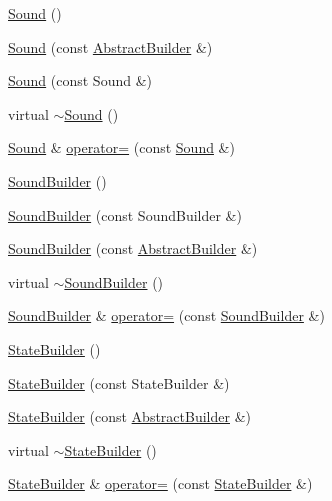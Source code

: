 \begin{DoxyCompactItemize}
\item 
\hyperlink{namespacejli_adde185173fc24f7fd6b0d882a8fa471a}{Sound} ()
\item 
\hyperlink{namespacejli_a0607478917c0dad447f434e0618be1d2}{Sound} (const \hyperlink{classjli_1_1_abstract_builder}{Abstract\+Builder} \&)
\item 
\hyperlink{namespacejli_aa43a8bc567a341ac22b4eb9777fa180f}{Sound} (const Sound \&)
\item 
virtual \hyperlink{namespacejli_a7ea6e34ab8f27d80c3a1e815d66ac26a}{$\sim$\+Sound} ()
\item 
\hyperlink{namespacejli_adde185173fc24f7fd6b0d882a8fa471a}{Sound} \& \hyperlink{namespacejli_aca4f80875a035dcd8150d8b0b9d9bc4f}{operator=} (const \hyperlink{namespacejli_adde185173fc24f7fd6b0d882a8fa471a}{Sound} \&)
\item 
\hyperlink{namespacejli_a8f4ec8e64074533a36d1da7cbb34cae1}{Sound\+Builder} ()
\item 
\hyperlink{namespacejli_a7e154f53d97abf9172ea552b57209ba2}{Sound\+Builder} (const Sound\+Builder \&)
\item 
\hyperlink{namespacejli_a8c348a752b55a388831e7ebcb7243a4c}{Sound\+Builder} (const \hyperlink{classjli_1_1_abstract_builder}{Abstract\+Builder} \&)
\item 
virtual \hyperlink{namespacejli_aeb7223070a119168071589071c350f6c}{$\sim$\+Sound\+Builder} ()
\item 
\hyperlink{namespacejli_a8f4ec8e64074533a36d1da7cbb34cae1}{Sound\+Builder} \& \hyperlink{namespacejli_a4642ebecf1bc8e3cbbca8668ce172e0c}{operator=} (const \hyperlink{namespacejli_a8f4ec8e64074533a36d1da7cbb34cae1}{Sound\+Builder} \&)
\item 
\hyperlink{namespacejli_ad40db8a38a4421bea677d34ce2b1a759}{State\+Builder} ()
\item 
\hyperlink{namespacejli_ad355813d947603bb1653a849bdce8091}{State\+Builder} (const State\+Builder \&)
\item 
\hyperlink{namespacejli_a6f4e96c0388922376eeaf52b342b2233}{State\+Builder} (const \hyperlink{classjli_1_1_abstract_builder}{Abstract\+Builder} \&)
\item 
virtual \hyperlink{namespacejli_af5aa191371c58b35a5415c56a8576f0f}{$\sim$\+State\+Builder} ()
\item 
\hyperlink{namespacejli_ad40db8a38a4421bea677d34ce2b1a759}{State\+Builder} \& \hyperlink{namespacejli_a5a2ca8f8cf2bfa115387afadf12aadd1}{operator=} (const \hyperlink{namespacejli_ad40db8a38a4421bea677d34ce2b1a759}{State\+Builder} \&)

\end{DoxyCompactItemize}
